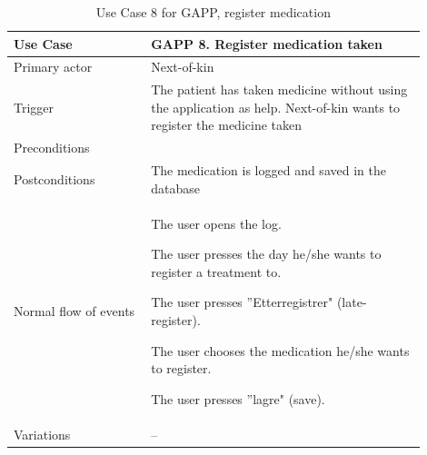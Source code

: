 \begin{table}
	\begin{center}
	    \begin{tabular}{|p{0.3\linewidth}|p{0.6\linewidth}|}
		    \hline
		    Use Case & GAPP 8. Register medication taken \\ \hline
		    Primary actor & Next-of-kin \\ \hline
		    Trigger & The patient has taken medicine without using the application as help. Next-of-kin wants to register the medicine taken \\ \hline
		    Preconditions & \\ \hline
		    Postconditions & The medication is logged and saved in the database \\ \hline
		    Normal flow of events & 
		    	\begin{tabulenum}
		    	  \item The user opens the log.
		    	  \item The user presses the day he/she wants to register a treatment to.
		    	  \item The user presses ''Etterregistrer" (late-register).
		    	  \item The user chooses the medication he/she wants to register.
		    	  \item The user presses ''lagre" (save).
		    	\end{tabulenum} \\ \hline
		    Variations & -- \\ \hline
	    \end{tabular}
    \end{center}
   	\caption{Use Case 8 for GAPP, register medication}
   	\label{tab:gappUseCase8}
\end{table}

